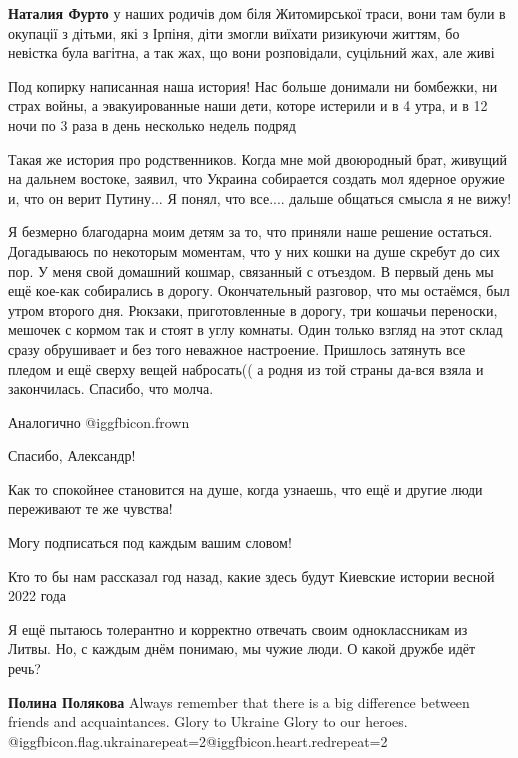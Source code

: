 \begin{itemize}
\begin{itemize}
\textbf{Наталия Фурто} у наших родичів дом біля Житомирської траси, вони там були в окупації з дітьми, які з Ірпіня, діти змогли виїхати ризикуючи життям, бо невістка була вагітна, а так жах, що вони розповідали, суцільний жах, але живі
\end{itemize} %


Под копирку написанная наша история! Нас больше донимали ни бомбежки, ни страх
войны, а эвакуированные наши дети, которе истерили и в 4 утра, и в 12 ночи по
3 раза в день несколько недель подряд


Такая же история про родственников. Когда мне мой двоюродный брат, живущий на
дальнем востоке, заявил, что Украина собирается создать мол ядерное оружие и,
что он верит Путину... Я понял, что все.... дальше общаться смысла я не вижу!


Я безмерно благодарна моим детям за то, что приняли наше решение остаться.
Догадываюсь по некоторым моментам, что у них кошки на душе скребут до сих пор.
У меня свой домашний кошмар, связанный с отъездом. В первый день мы ещё кое-как
собирались в дорогу. Окончательный разговор, что мы остаёмся, был утром второго
дня. Рюкзаки, приготовленные в дорогу, три кошачьи переноски, мешочек с кормом
так и стоят в углу комнаты. Один только взгляд на этот склад сразу обрушивает и
без того неважное настроение. Пришлось затянуть все пледом и ещё сверху вещей
набросать(( а родня из той страны да-вся взяла и закончилась. Спасибо, что
молча.

Аналогично  @igg{fbicon.frown} 


Спасибо, Александр!

Как то спокойнее становится на душе, когда узнаешь, что ещё и другие люди
переживают те же чувства!

Могу подписаться под каждым вашим словом!

Кто то бы нам рассказал год назад, какие здесь будут Киевские истории весной 2022 года


Я ещё пытаюсь толерантно и корректно отвечать своим одноклассникам из Литвы.
Но, с каждым днём понимаю, мы чужие люди. О какой дружбе идёт речь?

\begin{itemize} %
\textbf{Полина Полякова} Always remember that there is a big difference between friends and acquaintances.
Glory to Ukraine
Glory to our heroes.
@igg{fbicon.flag.ukraina}{repeat=2}@igg{fbicon.heart.red}{repeat=2}
\end{itemize} %


\end{itemize}
